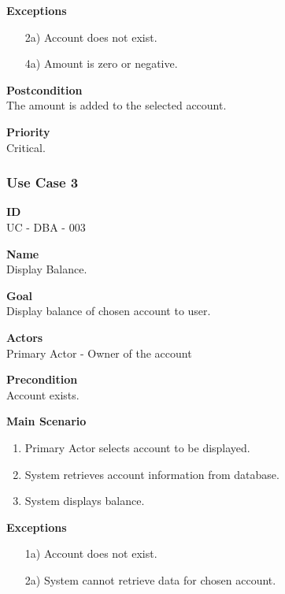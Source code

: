 \documentclass[12pt]{article}
\begin{document}
\noindent
    {\bf Exceptions}\\
    \vspace{-0.2in}
    \begin{itemize}
    \item[2a)] Account does not exist.
    \item[4a)] Amount is zero or negative.
    \end{itemize}

\noindent
{\bf Postcondition}\\
The amount is added to the selected account.

\noindent
{\bf Priority}\\
Critical.


\subsubsection{Use Case 3} \label{uc:3}

\noindent
{\bf ID}\\
UC - DBA - 003    

\noindent
{\bf Name}\\
Display Balance.

\noindent
{\bf Goal}\\
Display balance of chosen account to user.

\noindent
{\bf Actors}\\
Primary Actor - Owner of the account

\noindent
{\bf Precondition}\\
Account exists.

\noindent
{\bf Main Scenario}\\
\vspace*{-0.2in}
\begin{enumerate}
\item Primary Actor selects account to be displayed.
  \item System retrieves account information from database.
\item System displays balance.
\end{enumerate}

\noindent
{\bf Exceptions}\\
\vspace*{-0.2in}
\begin{itemize}
\item[1a)] Account does not exist.
\item[2a)] System cannot retrieve data for chosen account.
\end{itemize}
\end{document}

